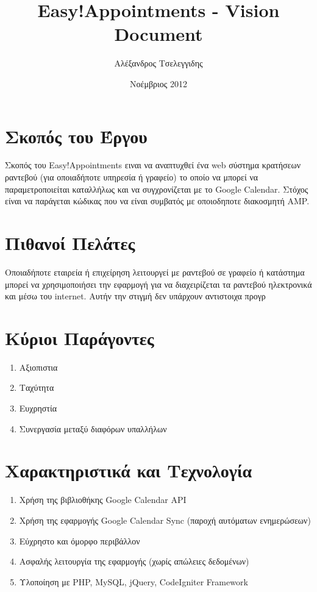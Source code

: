 \documentclass[12pt]{article}
\title{Easy!Appointments - Vision Document}
\author{Αλέξανδρος Τσελεγγιδης}
\date{Νοέμβριος 2012}
\begin{document}
\maketitle 
\pagebreak

\section{Σκοπός του Έργου}
Σκοπός του Easy!Appointments ειναι να αναπτυχθεί ένα web σύστημα κρατήσεων ραντεβού (για οποιαδήποτε υπηρεσία ή γραφείο) το οποίο να μπορεί να παραμετροποιείται καταλλήλως και να συγχρονίζεται με το Google Calendar. Στόχος είναι να παράγεται κώδικας που να είναι συμβατός με οποιοδηποτε διακοσμητή AMP.

\section{Πιθανοί Πελάτες}
Οποιαδήποτε εταιρεία ή επιχείρηση λειτουργεί με ραντεβού σε γραφείο ή κατάστημα μπορεί να χρησιμοποιήσει την εφαρμογή για να διαχειρίζεται τα ραντεβού ηλεκτρονικά και μέσω του internet. Αυτήν την στιγμή δεν υπάρχουν αντιστοιχα προγρ

\section{Κύριοι Παράγοντες}
\begin{enumerate}
\item{Αξιοπιστια}
\item{Ταχύτητα}
\item{Ευχρηστία}
\item{Συνεργασία μεταξύ διαφόρων υπαλλήλων}
\end{enumerate}

\section{Χαρακτηριστικά και Τεχνολογία}
\begin{enumerate}
\item{Χρήση της βιβλιοθήκης Google Calendar API}
\item{Χρήση της εφαρμογής Google Calendar Sync (παροχή αυτόματων ενημερώσεων)}
\item{Εύχρηστο και όμορφο περιβάλλον}
\item{Ασφαλής λειτουργία της εφαρμογής (χωρίς απώλειες δεδομένων)}
\item{Υλοποίηση με PHP, MySQL, jQuery, CodeIgniter Framework}
\end{enumerate}
\end{document}
